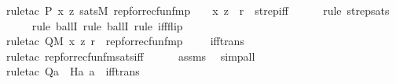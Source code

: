 \begin{isabellebody}
\ {\isacharparenleft}{\kern0pt}rule{\isacharunderscore}{\kern0pt}tac\ P{\isacharequal}{\kern0pt}{\isachardoublequoteopen}\ {\isasymlambda}x{\isachardot}{\kern0pt}\ {\isasymlambda}z{\isachardot}{\kern0pt}\ sats{\isacharparenleft}{\kern0pt}M{\isacharcomma}{\kern0pt}\ rep{\isacharunderscore}{\kern0pt}for{\isacharunderscore}{\kern0pt}recfun{\isacharunderscore}{\kern0pt}fm{\isacharparenleft}{\kern0pt}p{\isacharcomma}{\kern0pt}\ {}{\isacharcomma}{\kern0pt}\ {}{\isacharcomma}{\kern0pt}\ {}{\isacharparenright}{\kern0pt}{\isacharcomma}{\kern0pt}\ {\isacharbrackleft}{\kern0pt}x{\isacharcomma}{\kern0pt}\ z{\isacharbrackright}{\kern0pt}\ {\isacharat}{\kern0pt}\ {\isacharbrackleft}{\kern0pt}r{\isacharbrackright}{\kern0pt}{\isacharparenright}{\kern0pt}{\isachardoublequoteclose}\ \ strep{\isacharunderscore}{\kern0pt}iff{\isacharparenright}{\kern0pt}\isanewline
\ \ \ \ \isamarkupfalse%
\ {\isacharparenleft}{\kern0pt}rule\ strep{\isacharunderscore}{\kern0pt}sats{\isacharparenright}{\kern0pt}\isanewline
\ \ \ \ \isamarkupfalse%
\ {\isacharparenleft}{\kern0pt}rule\ ballI{\isacharsemicolon}{\kern0pt}\ rule\ ballI{\isacharsemicolon}{\kern0pt}\ rule\ iff{\isacharunderscore}{\kern0pt}flip{\isacharparenright}{\kern0pt}\isanewline
\ \ \ \ \isamarkupfalse%
\ {\isacharparenleft}{\kern0pt}rule{\isacharunderscore}{\kern0pt}tac\ Q{\isacharequal}{\kern0pt}{\isachardoublequoteopen}M{\isacharcomma}{\kern0pt}\ {\isacharbrackleft}{\kern0pt}x{\isacharcomma}{\kern0pt}\ z{\isacharcomma}{\kern0pt}\ r{\isacharbrackright}{\kern0pt}\ {\isasymTurnstile}\ rep{\isacharunderscore}{\kern0pt}for{\isacharunderscore}{\kern0pt}recfun{\isacharunderscore}{\kern0pt}fm{\isacharparenleft}{\kern0pt}p{\isacharcomma}{\kern0pt}\ {}{\isacharcomma}{\kern0pt}\ {}{\isacharcomma}{\kern0pt}\ {}{\isacharparenright}{\kern0pt}{\isachardoublequoteclose}\ \ iff{\isacharunderscore}{\kern0pt}trans{\isacharparenright}{\kern0pt}\ \isanewline
\ \ \ \ \isamarkupfalse%
\ {\isacharparenleft}{\kern0pt}rule{\isacharunderscore}{\kern0pt}tac\ rep{\isacharunderscore}{\kern0pt}for{\isacharunderscore}{\kern0pt}recfun{\isacharunderscore}{\kern0pt}fm{\isacharunderscore}{\kern0pt}sats{\isacharunderscore}{\kern0pt}iff{\isacharparenright}{\kern0pt}\isanewline
\ \ \ \ \isamarkupfalse%
\ assms\ \isamarkupfalse%
\ simp{\isacharunderscore}{\kern0pt}all\isanewline
\ \ \ \ \isamarkupfalse%
\ {\isacharparenleft}{\kern0pt}rule{\isacharunderscore}{\kern0pt}tac\ Q{\isacharequal}{\kern0pt}{\isachardoublequoteopen}a{}\ {\isacharequal}{\kern0pt}\ H{\isacharparenleft}{\kern0pt}a{}{\isacharcomma}{\kern0pt}\ a{}{\isacharparenright}{\kern0pt}{\isachardoublequoteclose}\ \ iff{\isacharunderscore}{\kern0pt}trans{\isacharparenright}{\kern0pt}\isanewline

\end{isabellebody}
